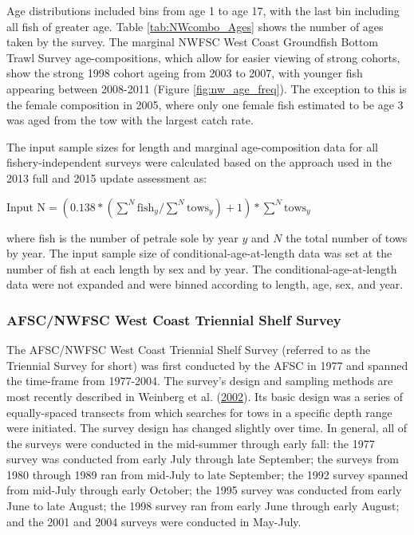 \documentclass[12pt,]{article}
\begin{document}
Age distributions included bins from age 1 to age 17, with the last bin
including all fish of greater age. Table \ref{tab:NWcombo_Ages} shows
the number of ages taken by the survey. The marginal NWFSC West Coast
Groundfish Bottom Trawl Survey age-compositions, which allow for easier
viewing of strong cohorts, show the strong 1998 cohort ageing from 2003
to 2007, with younger fish appearing between 2008-2011 (Figure
\ref{fig:nw_age_freq}). The exception to this is the female composition
in 2005, where only one female fish estimated to be age 3 was aged from
the tow with the largest catch rate.

The input sample sizes for length and marginal age-composition data for
all fishery-independent surveys were calculated based on the approach
used in the 2013 full and 2015 update assessment as:

\begin{centering}

$\text{Input N} = (0.138*(\sum_{}^{N} \text{fish}_{y} / \sum_{}^{N} \text{tows}_{y}) + 1)*\sum_{}^{N} \text{tows}_y$ 

\end{centering}

where fish is the number of petrale sole by year \(y\) and \(N\) the
total number of tows by year. The input sample size of
conditional-age-at-length data was set at the number of fish at each
length by sex and by year. The conditional-age-at-length data were not
expanded and were binned according to length, age, sex, and year.

\subsubsection{AFSC/NWFSC West Coast Triennial Shelf
Survey}\label{afscnwfsc-west-coast-triennial-shelf-survey}

The AFSC/NWFSC West Coast Triennial Shelf Survey (referred to as the
Triennial Survey for short) was first conducted by the AFSC in 1977 and
spanned the time-frame from 1977-2004. The survey's design and sampling
methods are most recently described in Weinberg et al.
(\protect\hyperlink{ref-weinberg_2001_2002}{2002}). Its basic design was
a series of equally-spaced transects from which searches for tows in a
specific depth range were initiated. The survey design has changed
slightly over time. In general, all of the surveys were conducted in the
mid-summer through early fall: the 1977 survey was conducted from early
July through late September; the surveys from 1980 through 1989 ran from
mid-July to late September; the 1992 survey spanned from mid-July
through early October; the 1995 survey was conducted from early June to
late August; the 1998 survey ran from early June through early August;
and the 2001 and 2004 surveys were conducted in May-July.
\end{document}

